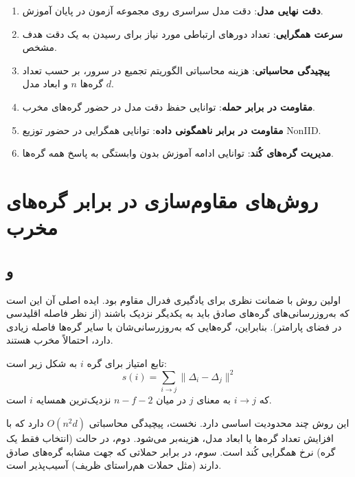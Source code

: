 \begin{enumerate}
    \item \textbf{دقت نهایی مدل}: دقت مدل سراسری روی مجموعه آزمون در پایان آموزش.
    
    \item \textbf{سرعت همگرایی}: تعداد دورهای ارتباطی مورد نیاز برای رسیدن به یک دقت هدف مشخص.
    
    \item \textbf{پیچیدگی محاسباتی}: هزینه محاسباتی الگوریتم تجمیع در سرور، بر حسب تعداد گره‌ها $n$ و ابعاد مدل $d$.
    
    \item \textbf{مقاومت در برابر حمله}: توانایی حفظ دقت مدل در حضور گره‌های مخرب.
    
    \item \textbf{مقاومت در برابر ناهمگونی داده}: توانایی همگرایی در حضور توزیع \gls{NonIID}.
    
    \item \textbf{مدیریت گره‌های کُند}: توانایی ادامه آموزش بدون وابستگی به پاسخ همه گره‌ها.
\end{enumerate}


\section{روش‌های مقاوم‌سازی در برابر گره‌های مخرب}
\label{sec:rw_robust}

\subsection{ و }

 \cite{blanchard2017machine} اولین روش با ضمانت نظری برای یادگیری فدرال مقاوم بود. ایده اصلی آن این است که به‌روزرسانی‌های گره‌های صادق باید به یکدیگر نزدیک باشند (از نظر فاصله اقلیدسی در فضای پارامتر). بنابراین، گره‌هایی که به‌روزرسانی‌شان با سایر گره‌ها فاصله زیادی دارد، احتمالاً مخرب هستند.

تابع امتیاز  برای گره $i$ به شکل زیر است:
\begin{equation}
    s(i) = \sum_{i \to j} \|\Delta_i - \Delta_j\|^2
    \label{eq:krum_full}
\end{equation}
که $i \to j$ به معنای $j$ در میان $n - f - 2$ نزدیک‌ترین همسایه $i$ است.

این روش چند محدودیت اساسی دارد. نخست، پیچیدگی محاسباتی $O(n^2 d)$ دارد که با افزایش تعداد گره‌ها یا ابعاد مدل، هزینه‌بر می‌شود. دوم، در حالت  (انتخاب فقط یک گره) نرخ همگرایی کُند است. سوم، در برابر حملاتی که جهت مشابه گره‌های صادق دارند (مثل حملات هم‌راستای ظریف) آسیب‌پذیر است.

